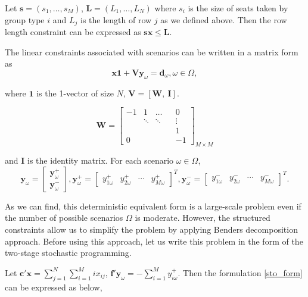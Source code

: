 
Let $\mathbf{s} = (s_1, \ldots, s_M)$, $\mathbf{L} = (L_1, \ldots, L_N)$ where $s_i$ is the size of seats taken by group type $i$ and $L_j$ is the length of row $j$ as we defined above. Then the row length constraint can be expressed as $\mathbf{s} \mathbf{x} \leq \mathbf{L}$.

The linear constraints associated with scenarios can be written in a matrix form as
\[\mathbf{x} \mathbf{1} + \mathbf{V} \mathbf{y}_\omega = \mathbf{d}_\omega, \omega\in \Omega,\]

where $\mathbf{1}$ is the 1-vector of size $N$, $\mathbf{V} = [\mathbf{W}, ~\mathbf{I}]$.  

$$
\mathbf{W}=\left[\begin{array}{ccccc}
-1 & 1 & \ldots & & 0 \\
& \ddots & \ddots & & \vdots \\
& & & & 1 \\
0 & & & & -1
\end{array}\right]_{M \times M}
$$

and $\mathbf{I}$ is the identity matrix. For each scenario $\omega \in \Omega$,
$$
\mathbf{y}_{\omega}=\left[\begin{array}{l}
\mathbf{y}_{\omega}^{+} \\
\mathbf{y}_{\omega}^{-}
\end{array}\right], \mathbf{y}_{\omega}^{+}=\left[\begin{array}{lllll}y_{1 \omega}^{+} & y_{2 \omega}^{+} & \cdots & y_{M \omega}^{+}\end{array}\right]^{T}, \mathbf{y}_{\omega}^{-}=\left[\begin{array}{llll}y_{1 \omega}^{-} & y_{2 \omega}^{-} & \cdots & y_{M \omega}^{-}\end{array}\right]^{T}.
$$

As we can find, this deterministic equivalent form is a large-scale problem even if the number of possible scenarios $\Omega$ is moderate. However, the structured constraints allow us to simplify the problem by applying Benders decomposition approach. Before using this approach, let us write this problem in the form of the two-stage stochastic programming.

Let $\mathbf{c}{'}\mathbf{x} = \sum_{j =1}^{N} \sum_{i=1}^M i x_{ij}$, $\mathbf{f}{'}\mathbf{y}_{\omega} = -\sum_{i=1}^{M} y_{i \omega}^{+}$. Then the formulation \eqref{sto_form} can be expressed as below,

